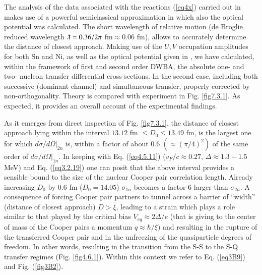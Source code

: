 The analysis of the data associated with the reactions (\ref{eq4x})  carried out in \cite{Montanari:14,Montanari:16} makes use of a powerful semiclassical approximation in which also the optical potential was calculated. The short wavelength of relative motion (de Broglie reduced wavelength $\lambdabar=0.36/2\pi$ fm$\approx0.06$ fm), allows to accurately determine the distance of closest approach. Making use of the $U,V$ occupation amplitudes for both Sn and Ni, as well as the optical potential given in \cite{Montanari:14}, we have calculated, within the framework of first and second order DWBA, the absolute one- and two- nucleon transfer differential cross sections.  In the second case, including both successive (dominant channel) and simultaneous transfer, properly corrected by non-orthogonality. Theory is compared with experiment in Fig. \ref{fig7.3.1}. As expected, it provides an overall account of the experimental findings.

As it emerges from direct inspection of Fig. \ref{fig7.3.1}, the distance of closest approach lying within the interval $13.12$ fm $\leq D_0\leq13.49$ fm, is the largest one for which $d\sigma /d\Omega|_{2n}$ is, within a factor of about 0.6 $(\approx(\pi/4)^2)$ of the same order of $d\sigma /d\Omega|_{1n}$. In keeping with Eq. (\ref{eq4.5.11}) ($v_F/c\approx0.27$, $\Delta\approx1.3-1.5$ MeV) and Eq. (\ref{eq3.2.19}) one can posit that the above interval provides a sensible bound to the size of the nuclear Cooper pair correlation length. Already increasing $D_0$ by 0.6 fm ($D_0=14.05$) $\sigma_{1n}$ becomes a factor 6 larger than $\sigma_{2n}$. A consequence  of forcing Cooper pair partners to tunnel across a barrier of ``width'' (distance of closest approach) $D>\xi$, leading to a strain which plays a role similar to that played by the critical bias $V_{eq}\approx2\Delta/e$ (that is giving to the center of mass of the Cooper pairs a momentum $q\approx\hbar/\xi)$ and resulting in the rupture of the transferred Cooper pair and in the unfreezing of the quasiparticle degrees of freedom. In other words, resulting in the transition from the S-S to the S-Q transfer  regimes (Fig. \ref{fig4.6.1}). Within this context we refer to Eq. (\ref{eq3B9}) and Fig. (\ref{fig3B2}).
 
